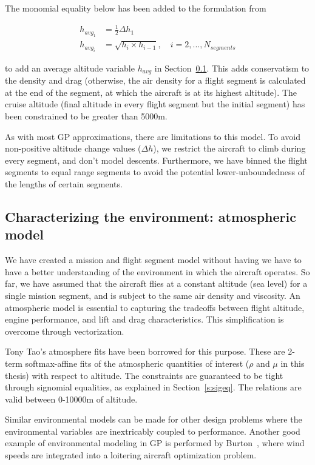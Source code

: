 The monomial equality below has been added to the formulation from~\cite{gassolar}

\begin{align}
    h_{{avg}_1} &= \frac{1}{2}\Delta h_1 \\
    h_{{avg}_i} &= \sqrt{h_{i} \times h_{i-1}}, \quad i = 2,...,N_{segments}
\end{align}

to add an average altitude variable $h_{avg}$ in Section~\ref{s:atmos}. This adds
conservatism to the density and drag (otherwise, the air density for a flight segment is calculated
at the end of the segment, at which the aircraft is at its highest altitude).
The cruise altitude (final altitude in every flight segment but the initial segment) has been constrained
to be greater than 5000m.

As with most \gls{GP} approximations, there are limitations to this model. To avoid non-positive
altitude change values ($\Delta h$), we restrict the aircraft to climb during every segment, and
don't model descents. Furthermore, we have binned the flight segments to equal range segments to
avoid the potential lower-unboundedness of the lengths of certain segments.

\subsection{Characterizing the environment: atmospheric model}
\label{s:atmos}

We have created a mission and flight segment model without having we have to have a better understanding
of the environment in which the aircraft operates. So far, we have assumed that
the aircraft flies at a constant altitude (sea level) for a single mission segment,
and is subject to the same air density and viscosity.
An atmospheric model is essential to capturing the tradeoffs between flight altitude, engine performance,
and lift and drag characteristics.
This simplification is overcome through vectorization.

Tony Tao's atmosphere fits have been borrowed for this purpose. These are
2-term softmax-affine fits of the atmospheric
quantities of interest ($\rho$ and $\mu$ in this thesis) with respect to altitude. The constraints
are guaranteed to be tight through signomial equalities, as explained in Section~\ref{s:sigeq}.
The relations are valid between 0-10000m of altitude.

Similar environmental models can be made for other design problems where the environmental
variables are inextricably coupled to performance. Another good example of environmental modeling
in \gls{GP} is performed by Burton~\cite{gassolar}, where wind speeds are integrated into
a loitering aircraft optimization problem.

